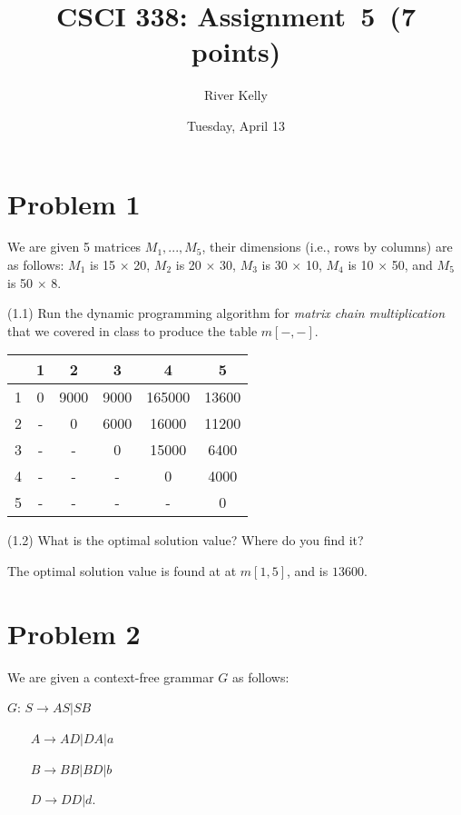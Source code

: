 \documentclass[11pt]{article}
\title{CSCI 338: Assignment~5~(7 points)}
\author{River Kelly}
\date{Tuesday, April 13}
\begin{document}
\maketitle

\newpage
\section*{Problem 1}

\noindent
We are given 5 matrices $M_1,...,M_5$, their dimensions (i.e., rows by columns)
are as follows: 
$M_1$ is 15 $\times$ 20,
$M_2$ is 20 $\times$ 30,
$M_3$ is 30 $\times$ 10,
$M_4$ is 10 $\times$ 50, and
$M_5$ is 50 $\times$ 8.
\newline

\noindent
(1.1) Run the dynamic programming algorithm for {\em matrix chain multiplication} that we covered in class to produce the table $m[-,-]$.

\begin{table}[H]
    \centering
    \begin{tabular}{c|c c c c c}
         & 1 & 2 & 3 & 4 & 5 \\
       \hline
       1 & 0 & 9000 & 9000 & 165000 & 13600 \\
       2 & - & 0 & 6000 & 16000 & 11200 \\
       3 & - & - & 0 & 15000 & 6400 \\
       4 & - & - & - & 0 & 4000\\
       5 & - & - & - & - & 0
    \end{tabular}
\end{table}


\noindent
(1.2) What is the optimal solution value? Where do you find it? 
\newline

\noindent
The optimal solution value is found at at $m\left[1,5\right]$, and is $13600$.
\newpage

\section*{Problem 2}

\noindent
We are given a context-free grammar $G$ as follows:
\newline

$G$: $S\rightarrow AS|SB$

~~~  $A\rightarrow AD|DA|a$

~~~  $B\rightarrow BB|BD|b$

~~~  $D\rightarrow DD|d$.
\end{document}
